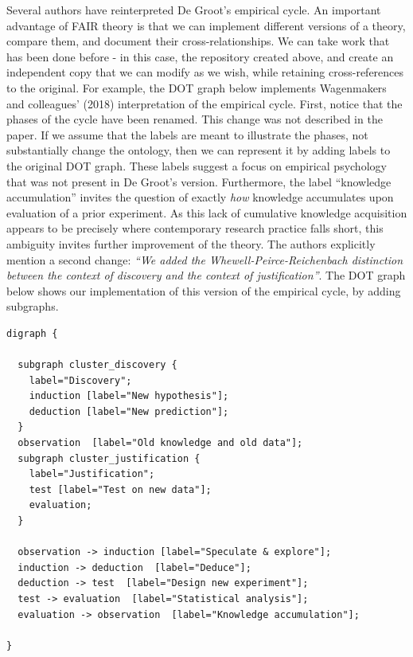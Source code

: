 \documentclass[
  man, noextraspace,floatsintext]{apa7}
\begin{document}
Several authors have reinterpreted De Groot's empirical cycle.
An important advantage of FAIR theory is that we can implement different versions of a theory, compare them, and document their cross-relationships.
We can take work that has been done before - in this case, the repository created above, and create an independent copy that we can modify as we wish, while retaining cross-references to the original.
For example, the DOT graph below implements Wagenmakers and colleagues' (2018) interpretation of the empirical cycle.
First, notice that the phases of the cycle have been renamed.
This change was not described in the paper.
If we assume that the labels are meant to illustrate the phases,
not substantially change the ontology,
then we can represent it by adding labels to the original DOT graph.
These labels suggest a focus on empirical psychology that was not present in De Groot's version.
Furthermore, the label ``knowledge accumulation'' invites the question of exactly \emph{how} knowledge accumulates upon evaluation of a prior experiment.
As this lack of cumulative knowledge acquisition appears to be precisely where contemporary research practice falls short, this ambiguity invites further improvement of the theory.
The authors explicitly mention a second change: \emph{``We added the Whewell-Peirce-Reichenbach distinction between the context of discovery and the context of justification''}.
The DOT graph below shows our implementation of this version of the empirical cycle, by adding subgraphs.

\begin{verbatim}
digraph {

  subgraph cluster_discovery {
    label="Discovery";
    induction [label="New hypothesis"];
    deduction [label="New prediction"];
  }
  observation  [label="Old knowledge and old data"];
  subgraph cluster_justification {
    label="Justification";
    test [label="Test on new data"];
    evaluation;
  }

  observation -> induction [label="Speculate & explore"];
  induction -> deduction  [label="Deduce"];
  deduction -> test  [label="Design new experiment"];
  test -> evaluation  [label="Statistical analysis"];
  evaluation -> observation  [label="Knowledge accumulation"];

}
\end{verbatim}
\end{document}
